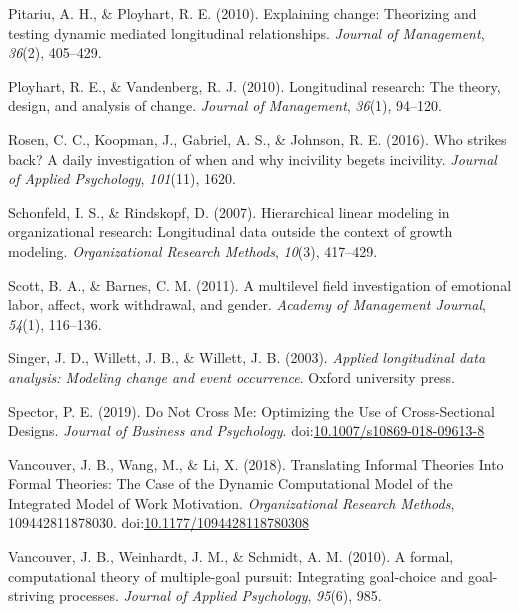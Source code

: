 \documentclass[english,,man]{apa6}
\theoremstyle{definition}
\theoremstyle{definition}
\theoremstyle{definition}
\theoremstyle{remark}
\begin{document}
\leavevmode\hypertarget{ref-pitariu_explaining_2010}{}%
Pitariu, A. H., \& Ployhart, R. E. (2010). Explaining change: Theorizing
and testing dynamic mediated longitudinal relationships. \emph{Journal
of Management}, \emph{36}(2), 405--429.

\leavevmode\hypertarget{ref-ployhart_longitudinal_2010}{}%
Ployhart, R. E., \& Vandenberg, R. J. (2010). Longitudinal research: The
theory, design, and analysis of change. \emph{Journal of Management},
\emph{36}(1), 94--120.

\leavevmode\hypertarget{ref-rosen_who_2016}{}%
Rosen, C. C., Koopman, J., Gabriel, A. S., \& Johnson, R. E. (2016). Who
strikes back? A daily investigation of when and why incivility begets
incivility. \emph{Journal of Applied Psychology}, \emph{101}(11), 1620.

\leavevmode\hypertarget{ref-schonfeld2007hierarchical}{}%
Schonfeld, I. S., \& Rindskopf, D. (2007). Hierarchical linear modeling
in organizational research: Longitudinal data outside the context of
growth modeling. \emph{Organizational Research Methods}, \emph{10}(3),
417--429.

\leavevmode\hypertarget{ref-scott_multilevel_2011}{}%
Scott, B. A., \& Barnes, C. M. (2011). A multilevel field investigation
of emotional labor, affect, work withdrawal, and gender. \emph{Academy
of Management Journal}, \emph{54}(1), 116--136.

\leavevmode\hypertarget{ref-singer_applied_2003}{}%
Singer, J. D., Willett, J. B., \& Willett, J. B. (2003). \emph{Applied
longitudinal data analysis: Modeling change and event occurrence}.
Oxford university press.

\leavevmode\hypertarget{ref-spector_not_2019}{}%
Spector, P. E. (2019). Do Not Cross Me: Optimizing the Use of
Cross-Sectional Designs. \emph{Journal of Business and Psychology}.
doi:\href{https://doi.org/10.1007/s10869-018-09613-8}{10.1007/s10869-018-09613-8}

\leavevmode\hypertarget{ref-vancouver_translating_2018}{}%
Vancouver, J. B., Wang, M., \& Li, X. (2018). Translating Informal
Theories Into Formal Theories: The Case of the Dynamic Computational
Model of the Integrated Model of Work Motivation. \emph{Organizational
Research Methods}, 109442811878030.
doi:\href{https://doi.org/10.1177/1094428118780308}{10.1177/1094428118780308}

\leavevmode\hypertarget{ref-vancouver2010formal}{}%
Vancouver, J. B., Weinhardt, J. M., \& Schmidt, A. M. (2010). A formal,
computational theory of multiple-goal pursuit: Integrating goal-choice
and goal-striving processes. \emph{Journal of Applied Psychology},
\emph{95}(6), 985.
\end{document}
